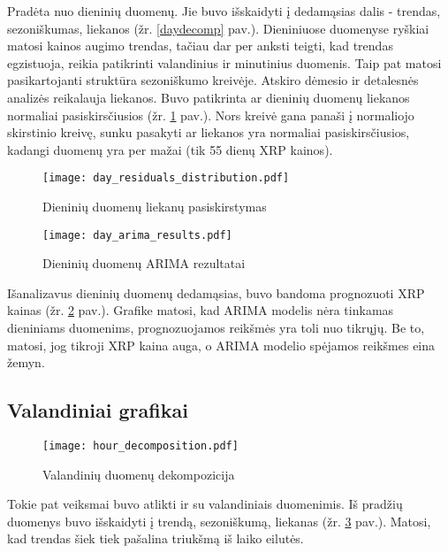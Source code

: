 \documentclass[12pt,a4paper]{article}
\begin{document}
Pradėta nuo dieninių duomenų. Jie buvo išskaidyti į dedamąsias dalis - trendas, sezoniškumas, liekanos (žr. \ref{daydecomp} pav.). Dieniniuose duomenyse ryškiai matosi kainos augimo trendas, tačiau dar per anksti teigti, kad trendas egzistuoja, reikia patikrinti valandinius ir minutinius duomenis. Taip pat matosi pasikartojanti struktūra sezoniškumo kreivėje. Atskiro dėmesio ir detalesnės analizės reikalauja liekanos. Buvo patikrinta ar dieninių duomenų liekanos normaliai pasiskirsčiusios (žr. \ref{dayresid} pav.). Nors kreivė gana panaši į normaliojo skirstinio kreivę, sunku pasakyti ar liekanos yra normaliai pasiskirsčiusios, kadangi duomenų yra per mažai (tik 55 dienų XRP kainos).

\begin{figure}[!h]
\centering
\caption{Dieninių duomenų liekanų pasiskirstymas}
\label{dayresid}
\texttt{[image: day\_residuals\_distribution.pdf]}
\end{figure}

\begin{figure}[!h]
\centering
\caption{Dieninių duomenų ARIMA rezultatai}
\label{dayarima}
\texttt{[image: day\_arima\_results.pdf]}
\end{figure}

Išanalizavus dieninių duomenų dedamąsias, buvo bandoma prognozuoti XRP kainas (žr. \ref{dayarima} pav.). Grafike matosi, kad ARIMA modelis nėra tinkamas dieniniams duomenims, prognozuojamos reikšmės yra toli nuo tikrųjų. Be to, matosi, jog tikroji XRP kaina auga, o ARIMA modelio spėjamos reikšmes eina žemyn.

\newpage

\subsection{Valandiniai grafikai}

\begin{figure}[!h]
\centering
\caption{Valandinių duomenų dekompozicija}
\label{hourdecomp}
\texttt{[image: hour\_decomposition.pdf]}
\end{figure}

Tokie pat veiksmai buvo atlikti ir su valandiniais duomenimis. Iš pradžių duomenys buvo išskaidyti į trendą, sezoniškumą, liekanas (žr. \ref{hourdecomp} pav.). Matosi, kad trendas šiek tiek pašalina triukšmą iš laiko eilutės. 
\end{document}
